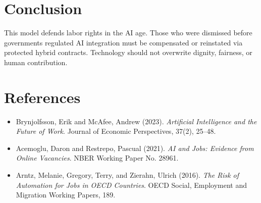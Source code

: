 \documentclass[12pt]{article}
\begin{document}
\section{Conclusion}
This model defends labor rights in the AI age. Those who were dismissed before governments regulated AI integration must be compensated or reinstated via protected hybrid contracts. Technology should not overwrite dignity, fairness, or human contribution.

\section*{References}

\begin{itemize}
\item Brynjolfsson, Erik and McAfee, Andrew (2023). \textit{Artificial Intelligence and the Future of Work}. Journal of Economic Perspectives, 37(2), 25--48.
\item Acemoglu, Daron and Restrepo, Pascual (2021). \textit{AI and Jobs: Evidence from Online Vacancies}. NBER Working Paper No. 28961.
\item Arntz, Melanie, Gregory, Terry, and Zierahn, Ulrich (2016). \textit{The Risk of Automation for Jobs in OECD Countries}. OECD Social, Employment and Migration Working Papers, 189.
\end{itemize}
\end{document}
